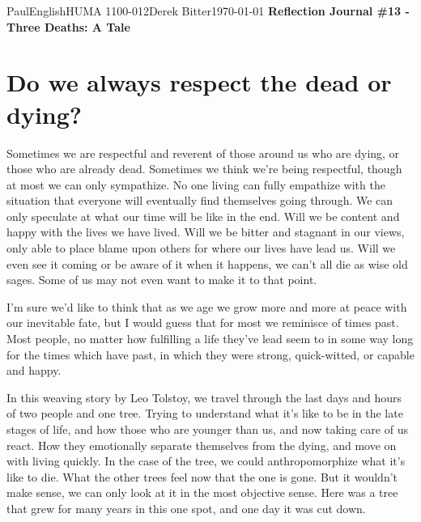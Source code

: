 \documentclass[12pt,letterpaper]{article}
\begin{document}
\begin{mla}{Paul}{English}{HUMA 1100-012}{Derek
    Bitter}{\today}    
    {\textbf{Reflection Journal \#13 - Three Deaths: A Tale}}

\section*{Do we always respect the dead or dying?}

Sometimes we are respectful and reverent of those around us who are
dying, or those who are already dead. Sometimes we think we're being
respectful, though at most we can only sympathize. No one living can
fully empathize with the situation that everyone will eventually find
themselves going through. We can only speculate at what our time will
be like in the end. Will we be content and happy with the lives we
have lived. Will we be bitter and stagnant in our views, only able to
place blame upon others for where our lives have lead us. Will we even
see it coming or be aware of it when it happens, we can't all die as
wise old sages. Some of us may not even want to make it to that point.

I'm sure we'd like to think that as we age we grow more and more at
peace with our inevitable fate, but I would guess that for most we
reminisce of times past. Most people, no matter how fulfilling a life
they've lead seem to in some way long for the times which have past,
in which they were strong, quick-witted, or capable and happy.

In this weaving story by Leo Tolstoy, we travel through the last days
and hours of two people and one tree. Trying to understand what it's
like to be in the late stages of life, and how those who are younger
than us, and now taking care of us react. How they emotionally
separate themselves from the dying, and move on with living quickly.
In the case of the tree, we could anthropomorphize what it's like to
die. What the other trees feel now that the one is gone. But it
wouldn't make sense, we can only look at it in the most objective
sense. Here was a tree that grew for many years in this one spot, and
one day it was cut down.


\end{mla}
\end{document}

